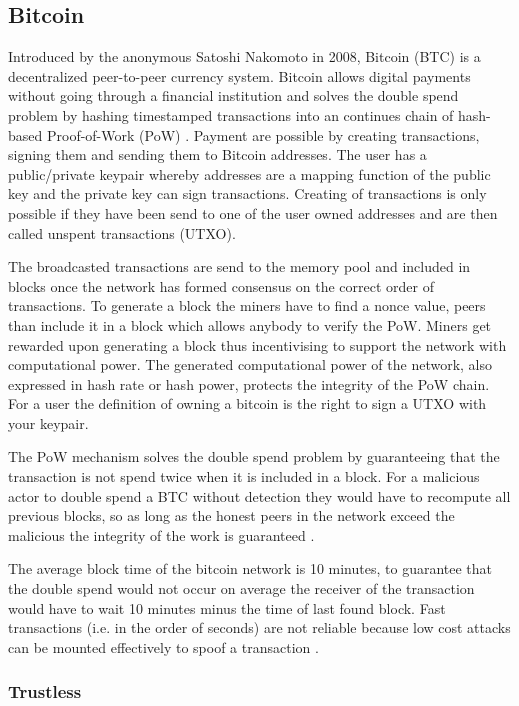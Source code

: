 \subsection{Bitcoin}

Introduced by the anonymous Satoshi Nakomoto in 2008, Bitcoin (BTC) is a decentralized peer-to-peer currency system. Bitcoin allows digital payments without going through a financial institution and solves the double spend problem by hashing timestamped transactions into an continues chain of hash-based Proof-of-Work (PoW) \cite{nakamoto2008bitcoin}. Payment are possible by creating transactions, signing them and sending them to Bitcoin addresses. The user has a public/private keypair whereby addresses are a mapping function of the public key and the private key can sign transactions. Creating of transactions is only possible if they have been send to one of the user owned addresses and are then called unspent transactions (UTXO).\par
The broadcasted transactions are send to the memory pool and included in blocks once the network has formed consensus on the correct order of transactions. To generate a block the miners  have to find a nonce value, peers than include it in a block which allows anybody to verify the PoW. Miners get rewarded upon generating a block thus incentivising to support the network with computational power. The generated computational power of the network, also expressed in hash rate or hash power, protects the integrity of the PoW chain. For a user the definition of owning a bitcoin is the right to sign a UTXO with your keypair.\par
The PoW mechanism solves the double spend problem by guaranteeing that the transaction is not spend twice when it is included in a block. For a malicious actor to double spend a BTC without detection they would have to recompute all previous blocks, so as long as the honest peers in the network exceed the malicious the integrity of the work is guaranteed \cite{nakamoto2008bitcoin}. \par
The average block time of the bitcoin network is 10 minutes, to guarantee that the double spend would not occur on average the receiver of the transaction would have to wait 10 minutes minus the time of last found block. Fast transactions (i.e. in the order of seconds) are not reliable because low cost attacks can be mounted effectively to spoof a transaction \cite{karame2012two}.

\subsubsection{Trustless}

